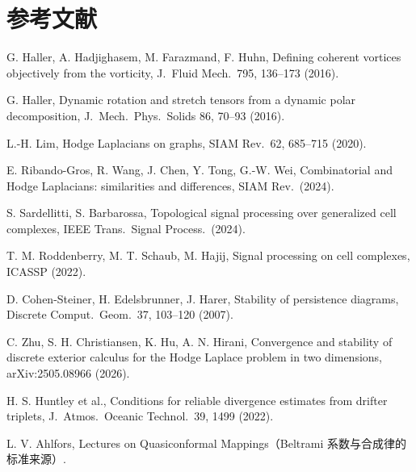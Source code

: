 \documentclass[10.5pt,a4paper]{article}
\theoremstyle{definition}
\theoremstyle{plain}
\theoremstyle{remark}
\begin{document}
\section*{参考文献}
{\small
\begin{enumerate}[label={[\arabic*]},leftmargin=2em,itemsep=0.1em]
\item G. Haller, A. Hadjighasem, M. Farazmand, F. Huhn, Defining coherent vortices objectively from the vorticity, J.\ Fluid Mech.\ 795, 136–173 (2016).
\item G. Haller, Dynamic rotation and stretch tensors from a dynamic polar decomposition, J.\ Mech.\ Phys.\ Solids 86, 70–93 (2016).
\item L.-H. Lim, Hodge Laplacians on graphs, SIAM Rev.\ 62, 685–715 (2020).
\item E. Ribando-Gros, R. Wang, J. Chen, Y. Tong, G.-W. Wei, Combinatorial and Hodge Laplacians: similarities and differences, SIAM Rev.\ (2024).
\item S. Sardellitti, S. Barbarossa, Topological signal processing over generalized cell complexes, IEEE Trans.\ Signal Process.\ (2024).
\item T. M. Roddenberry, M. T. Schaub, M. Hajij, Signal processing on cell complexes, ICASSP (2022).
\item D. Cohen-Steiner, H. Edelsbrunner, J. Harer, Stability of persistence diagrams, Discrete Comput.\ Geom.\ 37, 103–120 (2007).
\item C. Zhu, S. H. Christiansen, K. Hu, A. N. Hirani, Convergence and stability of discrete exterior calculus for the Hodge Laplace problem in two dimensions, arXiv:2505.08966 (2026).
\item H. S. Huntley et al., Conditions for reliable divergence estimates from drifter triplets, J.\ Atmos.\ Oceanic Technol.\ 39, 1499 (2022).
\item L. V. Ahlfors, Lectures on Quasiconformal Mappings（Beltrami 系数与合成律的标准来源）.
\end{enumerate}
}
\end{document}
